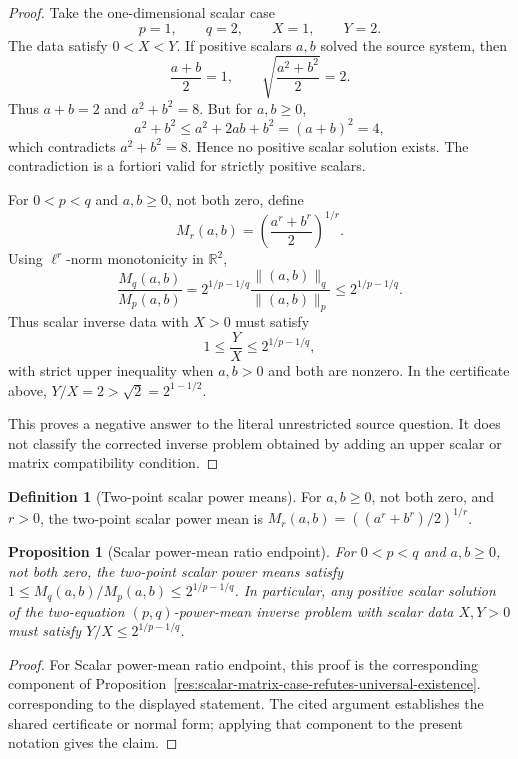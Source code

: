 \documentclass[11pt]{article}
\numberwithin{equation}{section}
\newtheorem{proposition}[theorem]{Proposition}
\theoremstyle{definition}
\newtheorem{definition}{Definition}[section]
\theoremstyle{remark}
\newcommand{\1}{\mathbf 1}
\begin{document}
\begin{proof}
Take the one-dimensional scalar case
\[
p=1,\qquad q=2,\qquad X=1,\qquad Y=2.
\]
The data satisfy \(0<X<Y\). If positive scalars \(a,b\) solved the source
system, then
\[
\frac{a+b}{2}=1,\qquad
\sqrt{\frac{a^2+b^2}{2}}=2.
\]
Thus \(a+b=2\) and \(a^2+b^2=8\). But for \(a,b\ge0\),
\[
a^2+b^2\le a^2+2ab+b^2=(a+b)^2=4,
\]
which contradicts \(a^2+b^2=8\). Hence no positive scalar solution exists.
The contradiction is a fortiori valid for strictly positive scalars.

For \(0<p<q\) and \(a,b\ge0\), not both zero, define
\[
M_r(a,b)=\left(\frac{a^r+b^r}{2}\right)^{1/r}.
\]
Using \(\ell^r\)-norm monotonicity in \(\mathbb R^2\),
\[
\frac{M_q(a,b)}{M_p(a,b)}
=
2^{1/p-1/q}\frac{\|(a,b)\|_q}{\|(a,b)\|_p}
\le 2^{1/p-1/q}.
\]
Thus scalar inverse data with \(X>0\) must satisfy
\[
1\le\frac{Y}{X}\le2^{1/p-1/q},
\]
with strict upper inequality when \(a,b>0\) and both are nonzero. In the
certificate above, \(Y/X=2>\sqrt2=2^{1-1/2}\).

This proves a negative answer to the literal unrestricted source question.
It does not classify the corrected inverse problem obtained by adding an
upper scalar or matrix compatibility condition.
\end{proof}

\begin{definition}[Two-point scalar power means]
\label{res:scalarpowermean-2point}
For \(a,b\ge0\), not both zero, and \(r>0\), the two-point scalar power mean is \(M_r(a,b)=((a^r+b^r)/2)^{1/r}\).
\end{definition}

\begin{proposition}[Scalar power-mean ratio endpoint]
\label{res:scalarpowermean-ratio-endpoint}
For \(0<p<q\) and \(a,b\ge0\), not both zero, the two-point scalar power means satisfy \(1\le M_q(a,b)/M_p(a,b)\le2^{1/p-1/q}\). In particular, any positive scalar solution of the two-equation \((p,q)\)-power-mean inverse problem with scalar data \(X,Y>0\) must satisfy \(Y/X\le2^{1/p-1/q}\).
\end{proposition}

\begin{proof}
For Scalar power-mean ratio endpoint, this proof is the corresponding component of Proposition~\ref{res:scalar-matrix-case-refutes-universal-existence}.  corresponding to the displayed statement.  The cited argument establishes the shared certificate or normal form; applying that component to the present notation gives the claim.
\end{proof}
\end{document}
